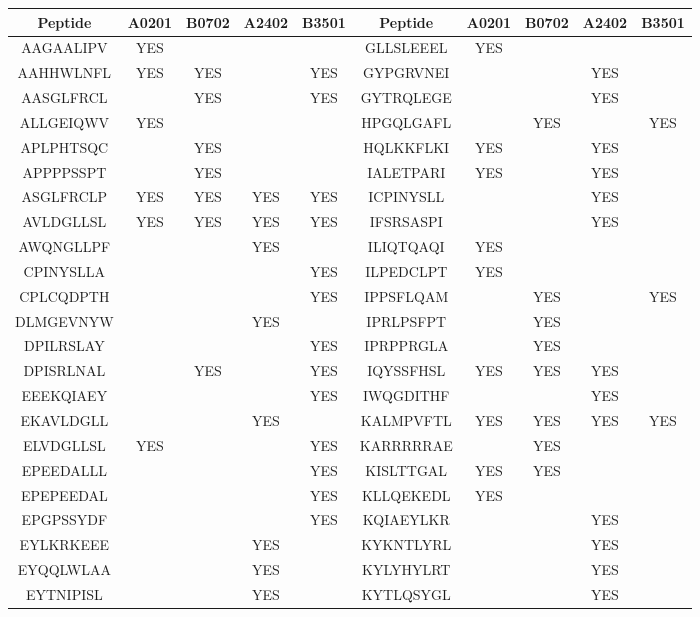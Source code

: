 \begin{table}[htp]
\begin{center}
\begin{sideways}
\begin{tabulary}{1.5\textwidth}{|c|c|c|c|c|c|c|c|c|c|}
\hline
Peptide & A0201 & B0702 & A2402 & B3501 & Peptide & A0201 & B0702 & A2402 & B3501 \bigstrut \\
\hline
AAGAALIPV & YES &  &  &  & GLLSLEEEL & YES &  &  &  \bigstrut[t] \\
AAHHWLNFL & YES & YES &  & YES & GYPGRVNEI &  &  & YES &  \\
AASGLFRCL &  & YES &  & YES & GYTRQLEGE &  &  & YES &  \\
ALLGEIQWV & YES &  &  &  & HPGQLGAFL &  & YES &  & YES \\
APLPHTSQC &  & YES &  &  & HQLKKFLKI & YES &  & YES &  \\
APPPPSSPT &  & YES &  &  & IALETPARI & YES &  & YES &  \\
ASGLFRCLP & YES & YES & YES & YES & ICPINYSLL &  &  & YES &  \\
AVLDGLLSL & YES & YES & YES & YES & IFSRSASPI &  &  & YES &  \\
AWQNGLLPF &  &  & YES &  & ILIQTQAQI & YES &  &  &  \\
CPINYSLLA &  &  &  & YES & ILPEDCLPT & YES &  &  &  \\
CPLCQDPTH &  &  &  & YES & IPPSFLQAM &  & YES &  & YES \\
DLMGEVNYW &  &  & YES &  & IPRLPSFPT &  & YES &  &  \\
DPILRSLAY &  &  &  & YES & IPRPPRGLA &  & YES &  &  \\
DPISRLNAL &  & YES &  & YES & IQYSSFHSL & YES & YES & YES &  \\
EEEKQIAEY &  &  &  & YES & IWQGDITHF &  &  & YES &  \\
EKAVLDGLL &  &  & YES &  & KALMPVFTL & YES & YES & YES & YES \\
ELVDGLLSL & YES &  &  & YES & KARRRRRAE &  & YES &  &  \\
EPEEDALLL &  &  &  & YES & KISLTTGAL & YES & YES &  &  \\
EPEPEEDAL &  &  &  & YES & KLLQEKEDL & YES &  &  &  \\
EPGPSSYDF &  &  &  & YES & KQIAEYLKR &  &  & YES &  \\
EYLKRKEEE &  &  & YES &  & KYKNTLYRL &  &  & YES &  \\
EYQQLWLAA &  &  & YES &  & KYLYHYLRT &  &  & YES &  \\
EYTNIPISL &  &  & YES &  & KYTLQSYGL &  &  & YES &  \\

\end{tabulary}
\end{sideways}
\end{center}
\end{table}
